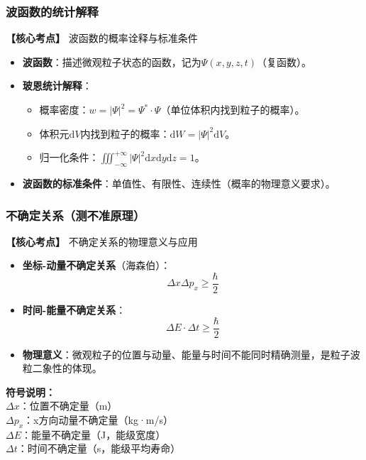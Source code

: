 \subsubsection{波函数的统计解释}
\textbf{【核心考点】} 波函数的概率诠释与标准条件 \par\vspace{0.3em}
\begin{itemize}
    \item \textbf{波函数}：描述微观粒子状态的函数，记为$\Psi(x,y,z,t)$（复函数）。
    \item \textbf{玻恩统计解释}：
          \begin{itemize}
              \item 概率密度：$w = |\Psi|^2 = \Psi^* \cdot \Psi$（单位体积内找到粒子的概率）。
              \item 体积元$\mathrm{d}V$内找到粒子的概率：$\mathrm{d}W = |\Psi|^2 \mathrm{d}V$。
              \item 归一化条件：$\iiint_{-\infty}^{+\infty} |\Psi|^2 \mathrm{d}x\mathrm{d}y\mathrm{d}z = 1$。
          \end{itemize}
    \item \textbf{波函数的标准条件}：单值性、有限性、连续性（概率的物理意义要求）。
\end{itemize}
\vspace{0.5em}

\subsubsection{不确定关系（测不准原理）}
\textbf{【核心考点】} 不确定关系的物理意义与应用 \par\vspace{0.3em}
\begin{itemize}
    \item \textbf{坐标-动量不确定关系}（海森伯）：
          \[
          \Delta x \Delta p_x \ge \frac{\hbar}{2}
          \]
    \item \textbf{时间-能量不确定关系}：
          \[
          \Delta E \cdot \Delta t \ge \frac{\hbar}{2}
          \]
    \item \textbf{物理意义}：微观粒子的位置与动量、能量与时间不能同时精确测量，是粒子波粒二象性的体现。
\end{itemize}

\textbf{符号说明：}\\
$\Delta x$：位置不确定量（m） \\
$\Delta p_x$：x方向动量不确定量（kg·m/s） \\
$\Delta E$：能量不确定量（J，能级宽度） \\
$\Delta t$：时间不确定量（s，能级平均寿命）
\vspace{0.5em}

